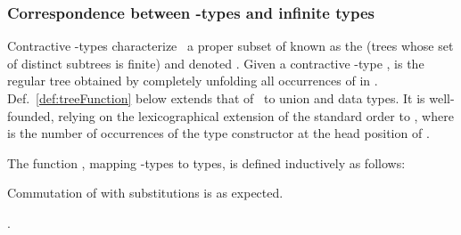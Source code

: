 \subsubsection{Correspondence between \texorpdfstring{}{u}-types and infinite types}


Contractive -types
characterize~\cite{journals/tcs/Courcelle83,DBLP:journals/toplas/AmadioC93,DBLP:journals/fuin/BrandtH98,Pierce:2002:TPL:509043}
a proper subset of  known as the  (trees whose
set of distinct subtrees is finite) and denoted .
Given a contractive -type ,  is the regular tree obtained
by completely unfolding all occurrences of  in .
Def.~\ref{def:treeFunction} below extends that of~\cite{Pierce:2002:TPL:509043}
to union and data types. It is well-founded, relying on the lexicographical
extension of the standard order to ,
where  is the number of occurrences of the 
type constructor at the head position of .

\begin{definition}
\label{def:treeFunction}
The function , mapping -types to types, is defined inductively as follows: 
\end{definition}



Commutation of  with substitutions is as expected. 

\begin{lemma}
\label{lem:substitutionOfTrees}
.
\end{lemma}

